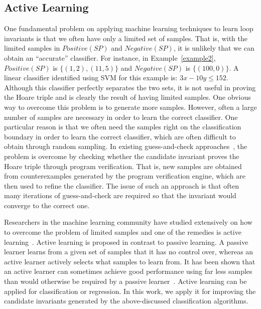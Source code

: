 \subsection{Active Learning} \label{active}
One fundamental problem on applying machine learning techniques to learn loop invariants is that we often have only a limited set of samples. That is, with the limited samples in $Positive(SP)$ and $Negative(SP)$, it is unlikely that we can obtain an ``accurate'' classifier. For instance, in Example~\ref{example2}, $Positive(SP)$ is $\{(1, 2),(11, 5)\}$ and $Negative(SP)$ is $\{(100, 0)\}$. A linear classifier identified using SVM for this example is: $3x-10y \leq 152$. Although this classifier perfectly separates the two sets, it is not useful in proving the Hoare triple and is clearly the result of having limited samples.
One obvious way to overcome this problem is to generate more samples. However, often a large number of samples are necessary in order to learn the correct classifier. One particular reason is that we often need the samples right on the classification boundary in order to learn the correct classifier, which are often difficult to obtain through random sampling. In existing guess-and-check approaches~\cite{sharma2012interpolants,sharma2013verification,DBLP:conf/esop/0001GHALN13,sharma2014invariant}, the problem is overcome by checking whether the candidate invariant proves the Hoare triple through program verification. That is, new samples are obtained from counterexamples generated by the program verification engine, which are then used to refine the classifier. The issue of such an approach is that often many iterations of guess-and-check are required so that the invariant would converge to the correct one.

Researchers in the machine learning community have studied extensively on how to overcome the problem of limited samples and one of the remedies is active learning~\cite{DBLP:series/synthesis/2012Settles}.
Active learning is proposed in contrast to passive learning. A passive learner learns from a given set of samples that it has no control over, whereas an active learner actively selects what samples to learn from. It has been shown that an active learner can sometimes achieve good performance using far less samples than would otherwise be required by a passive learner~\cite{DBLP:conf/mm/TongC01,DBLP:journals/jmlr/TongK01}. Active learning can be applied for classification or regression. In this work, we apply it for improving the candidate invariants generated by the above-discussed classification algorithms.


